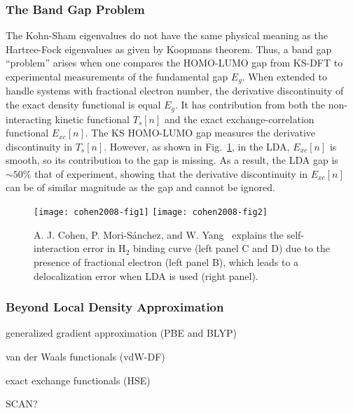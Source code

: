 \subsubsection{The Band Gap Problem} \label{sec:method-dft-bandgap}
The Kohn-Sham eigenvalues do not have the same physical meaning as the Hartree-Fock eigenvalues as given by Koopmans theorem. Thus, a band gap ``problem'' arises when one compares the HOMO-LUMO gap from KS-DFT to experimental measurements of the fundamental gap $E_g$. When extended to handle systems with fractional electron number, the derivative discontinuity of the exact density functional is equal $E_g$. It has contribution from both the non-interacting kinetic functional $T_s[n]$ and the exact exchange-correlation functional $E_{xc}[n]$. The KS HOMO-LUMO gap measures the derivative discontinuity in $T_s[n]$. However, as shown in Fig.~\ref{fig:method-dft-smooth-lda}, in the LDA, $E_{xc}[n]$ is smooth, so its contribution to the gap is missing. As a result, the LDA gap is $\sim 50\%$ that of experiment, showing that the derivative discontinuity in $E_{xc}[n]$ can be of similar magnitude as the gap and cannot be ignored.

\begin{figure}[h]
\texttt{[image: cohen2008-fig1]}
\texttt{[image: cohen2008-fig2]}
\caption{A. J. Cohen, P. Mori-S\'anchez, and W. Yang~\cite{Cohen2008} explains the self-interaction error in H$_2$ binding curve (left panel C and D) due to the presence of fractional electron (left panel B), which leads to a delocalization error when LDA is used (right panel).}
\label{fig:method-dft-smooth-lda}
\end{figure}


\subsubsection{Beyond Local Density Approximation}

generalized gradient approximation (PBE and BLYP)

van der Waals functionals (vdW-DF)

exact exchange functionals (HSE)

SCAN?